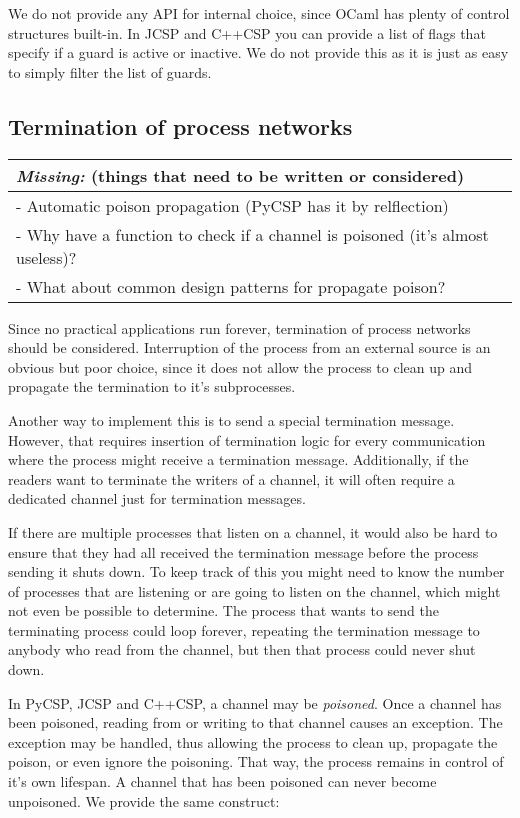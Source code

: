 \documentclass[a4paper,12pt]{article}
\newcommand{\missing}[1]{
  \begin{tabular}{|p{11cm}|}
    \hline
    \emph{Missing:} {\scriptsize (things that need to be written or considered)} \\
    \hline
    #1
    \hline
  \end{tabular}
}
\begin{document}
We do not provide any API for internal choice, since OCaml has plenty of control structures built-in.
In JCSP and C++CSP you can provide a list of flags that specify if a guard is active or inactive. We
do not provide this as it is just as easy to simply filter the list of guards.

\subsection{Termination of process networks}
\missing{
- Automatic poison propagation (PyCSP has it by relflection)\\
- Why have a function to check if a channel is poisoned (it's almost useless)?\\
- What about common design patterns for propagate poison?\\
}

Since no practical applications run forever, termination of process networks should be considered.
Interruption of the process from an external source is an obvious but poor choice, since it does not
allow the process to clean up and propagate the termination to it's subprocesses.

Another way to implement this is to send a special termination message. However, that requires 
insertion of termination logic for every communication where the process might receive a termination 
message. Additionally, if the readers want to terminate the writers of a channel, it will often 
require a dedicated channel just for termination messages.

If there are multiple processes that listen on a channel, it would also be hard to ensure that they had
all received the termination message before the process sending it shuts down. To keep track of this you
might need to know the number of processes that are listening or are going to listen on the channel, 
which might not even be possible to determine. The process that wants to send the terminating process 
could loop forever, repeating the termination message to anybody who read from the channel, but then 
that process could never shut down.

In PyCSP, JCSP and C++CSP, a channel may be \emph{poisoned}. Once a channel has been poisoned, reading
from or writing to that channel causes an exception. The exception may be handled, thus allowing the
process to clean up, propagate the poison, or even ignore the poisoning. That way, the process remains
in control of it's own lifespan. A channel that has been poisoned can never become unpoisoned.
We provide the same construct:
\end{document}
